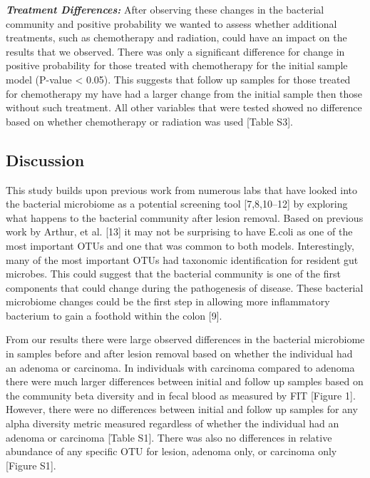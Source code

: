 \documentclass[12pt,]{article}
\begin{document}
\textbf{\emph{Treatment Differences:}} After observing these changes in
the bacterial community and positive probability we wanted to assess
whether additional treatments, such as chemotherapy and radiation, could
have an impact on the results that we observed. There was only a
significant difference for change in positive probability for those
treated with chemotherapy for the initial sample model (P-value
\textless{} 0.05). This suggests that follow up samples for those
treated for chemotherapy my have had a larger change from the initial
sample then those without such treatment. All other variables that were
tested showed no difference based on whether chemotherapy or radiation
was used {[}Table S3{]}.

\newpage

\subsection{Discussion}\label{discussion}

This study builds upon previous work from numerous labs that have looked
into the bacterial microbiome as a potential screening tool
{[}7,8,10--12{]} by exploring what happens to the bacterial community
after lesion removal. Based on previous work by Arthur, et al. {[}13{]}
it may not be surprising to have E.coli as one of the most important
OTUs and one that was common to both models. Interestingly, many of the
most important OTUs had taxonomic identification for resident gut
microbes. This could suggest that the bacterial community is one of the
first components that could change during the pathogenesis of disease.
These bacterial microbiome changes could be the first step in allowing
more inflammatory bacterium to gain a foothold within the colon {[}9{]}.

From our results there were large observed differences in the bacterial
microbiome in samples before and after lesion removal based on whether
the individual had an adenoma or carcinoma. In individuals with
carcinoma compared to adenoma there were much larger differences between
initial and follow up samples based on the community beta diversity and
in fecal blood as measured by FIT {[}Figure 1{]}. However, there were no
differences between initial and follow up samples for any alpha
diversity metric measured regardless of whether the individual had an
adenoma or carcinoma {[}Table S1{]}. There was also no differences in
relative abundance of any specific OTU for lesion, adenoma only, or
carcinoma only {[}Figure S1{]}.
\end{document}
